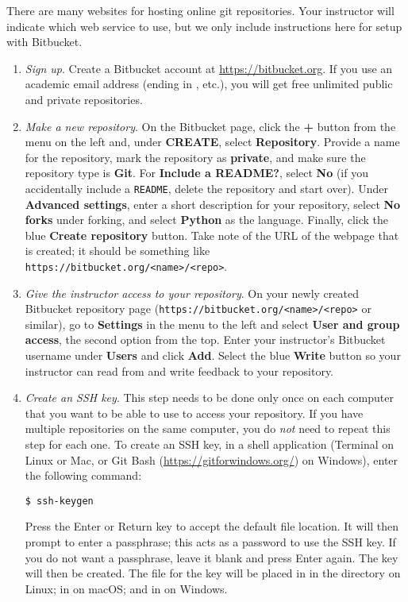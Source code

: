 There are many websites for hosting online git repositories.
Your instructor will indicate which web service to use, but we only include instructions here for setup with Bitbucket.

\begin{enumerate}
\item \emph{Sign up}.
\label{step:sign-up}
Create a Bitbucket account at \url{https://bitbucket.org}.
If you use an academic email address (ending in , etc.), you will get free unlimited public and private repositories.

\item \emph{Make a new repository}.
On the Bitbucket page, click the \textbf{+} button from the menu on the left and, under \textbf{CREATE}, select \textbf{Repository}.
Provide a name for the repository, mark the repository as \textbf{private}, and make sure the repository type is \textbf{Git}.
For \textbf{Include a README?}, select \textbf{No} (if you accidentally include a \texttt{README}, delete the repository and start over).
Under \textbf{Advanced settings}, enter a short description for your repository, select \textbf{No forks} under forking, and select \textbf{Python} as the language.
Finally, click the blue \textbf{Create repository} button.
Take note of the URL of the webpage that is created; it should be something like \texttt{https://bitbucket.org/<name>/<repo>}.

\item \emph{Give the instructor access to your repository}.
On your newly created Bitbucket repository page (\texttt{https://bitbucket.org/<name>/<repo>} or similar), go to \textbf{Settings} in the menu to the left and select \textbf{User and group access}, the second option from the top.
Enter your instructor's Bitbucket username under \textbf{Users} and click \textbf{Add}.
Select the blue \textbf{Write} button so your instructor can read from and write feedback to your repository.

\item \emph{Create an SSH key}.
This step needs to be done only once on each computer that you want to be able to use to access your repository.
If you have multiple repositories on the same computer, you do \emph{not} need to repeat this step for each one.
To create an SSH key,
in a shell application (Terminal on Linux or Mac, or Git Bash (\url{https://gitforwindows.org/}) on Windows), enter the following command:
\begin{lstlisting}
$ ssh-keygen
\end{lstlisting}
Press the Enter or Return key to accept the default file location.
It will then prompt to enter a passphrase; this acts as a password to use the SSH key.
If you do not want a passphrase, leave it blank and press Enter again.
The key will then be created.
The file for the key will be placed in in the  directory on Linux; in  on macOS; and in  on Windows.


\end{enumerate}
